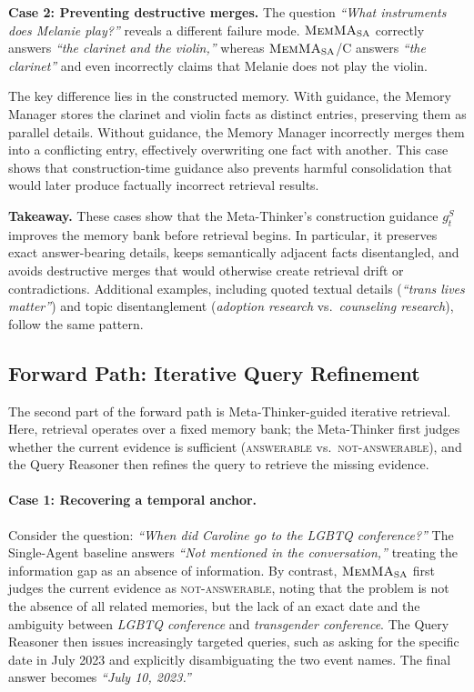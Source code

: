\noindent\textbf{Case 2: Preventing destructive merges.}
The question \emph{``What instruments does Melanie play?''} reveals a different failure mode.
$\textnormal{\textsc{MemMA}}_{\mathrm{SA}}$ correctly answers \emph{``the clarinet and the violin,''} whereas $\textnormal{\textsc{MemMA}}_{\mathrm{SA}}$/C answers \emph{``the clarinet''} and even incorrectly claims that Melanie does not play the violin.

The key difference lies in the constructed memory.
With guidance, the Memory Manager stores the clarinet and violin facts as distinct entries, preserving them as parallel details.
Without guidance, the Memory Manager incorrectly merges them into a conflicting entry, effectively overwriting one fact with another.
This case shows that construction-time guidance also prevents harmful consolidation that would later produce factually incorrect retrieval results.

\noindent\textbf{Takeaway.}
These cases show that the Meta-Thinker's construction guidance $g_t^S$ improves the memory bank before retrieval begins.
In particular, it preserves exact answer-bearing details, keeps semantically adjacent facts disentangled, and avoids destructive merges that would otherwise create retrieval drift or contradictions.
Additional examples, including quoted textual details (\emph{``trans lives matter''}) and topic disentanglement (\emph{adoption research} vs.\ \emph{counseling research}), follow the same pattern.

\subsection{Forward Path: Iterative Query Refinement}
\label{appendix:case_forward_refinement}
The second part of the forward path is Meta-Thinker-guided iterative retrieval.
Here, retrieval operates over a fixed memory bank; the Meta-Thinker first judges whether the current evidence is sufficient (\textsc{answerable} vs.\ \textsc{not-answerable}), and the Query Reasoner then refines the query to retrieve the missing evidence.

\paragraph{Case 1: Recovering a temporal anchor.}
Consider the question: \emph{``When did Caroline go to the LGBTQ conference?''}
The Single-Agent baseline answers \emph{``Not mentioned in the conversation,''} treating the information gap as an absence of information.
By contrast, $\textnormal{\textsc{MemMA}}_{\mathrm{SA}}$ first judges the current evidence as \textsc{not-answerable}, noting that the problem is not the absence of all related memories, but the lack of an exact date and the ambiguity between \emph{LGBTQ conference} and \emph{transgender conference}.
The Query Reasoner then issues increasingly targeted queries, such as asking for the specific date in July 2023 and explicitly disambiguating the two event names.
The final answer becomes \emph{``July 10, 2023.''}

